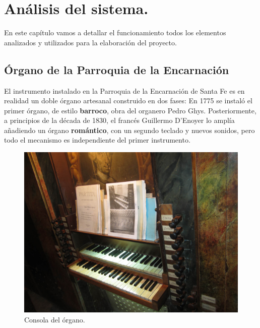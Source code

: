 
\chapter{Análisis del sistema.}
\label{cap:capitulo_3}

En este capítulo vamos a detallar el funcionamiento todos los elementos analizados y utilizados para la elaboración del proyecto.

\section{Órgano de la Parroquia de la Encarnación}

El instrumento instalado en la Parroquia de la Encarnación de Santa Fe es en realidad un doble órgano artesanal construido en dos fases: En 1775 se instaló el primer órgano, de estilo \textbf{barroco}, obra del organero Pedro Ghys. Posteriormente, a principios de la década de 1830, el francés Guillermo D'Enoyer lo amplía añadiendo un órgano \textbf{romántico}, con un segundo teclado y nuevos sonidos, pero todo el mecanismo es independiente del primer instrumento.

\smallskip

\begin{figure}[H]
	\noindent \begin{centering}
		\includegraphics[width=\linewidth*3/4]{capitulo3/consola}
		\par\end{centering}
	\smallskip
	\caption{\label{fig:consola} Consola del órgano.}
\end{figure} 

